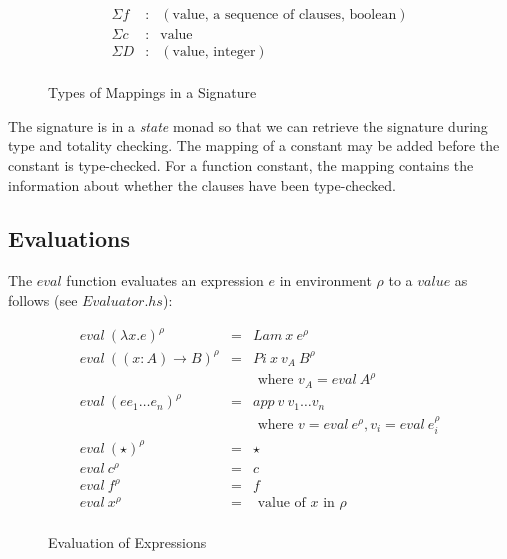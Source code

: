\begin{figure}[H]
  \begin{equation*}
    \begin{aligned}
      \Sigma f & : & (\textrm{value, a sequence of clauses, boolean}) \\
      \Sigma c & : & \textrm{value}                                   \\
      \Sigma D & : & (\textrm{value, integer})                        \\
    \end{aligned}
  \end{equation*}
  \caption{Types of Mappings in a Signature}
\end{figure}

The signature is in a \emph{state} monad so that we can retrieve the signature during type and totality checking. The mapping of a constant may be added before the constant is type-checked. For a function constant, the mapping contains the information about whether the clauses have been type-checked.

\subsection{Evaluations}
\label{sec:eval}

The $eval$ function evaluates an expression $e$ in environment $\rho$ to a
$value$ as follows (see $Evaluator.hs$):

\begin{figure}[H]
  \begin{equation*}
    \begin{aligned}
      eval \: (\lambda x . e)^{\rho}   & = & Lam \: x \: e^{\rho}                                            \\
      eval \: ((x:A) \to B)^{\rho}     & = & Pi \: x \: v_A \: B^{\rho}                                      \\
                                       &   & \textrm{ where } v_A = eval \: A^{\rho}                         \\
      eval \: (e e_1 \dots e_n)^{\rho} & = & app \: v \: v_1 \dots v_n                                       \\
                                       &   & \textrm{ where } v = eval \: e^{\rho}, v_i = eval \: e_i^{\rho} \\
      eval \: (\star)^{\rho}           & = & \star                                                           \\
      eval \: c^{\rho}                 & = & c                                                               \\
      eval \: f^{\rho}                 & = & f                                                               \\
      eval \: x^{\rho}                 & = & \textrm{ value of } x \textrm{ in } \rho                        \\
    \end{aligned}
  \end{equation*}
  \caption{Evaluation of Expressions}
\end{figure}

